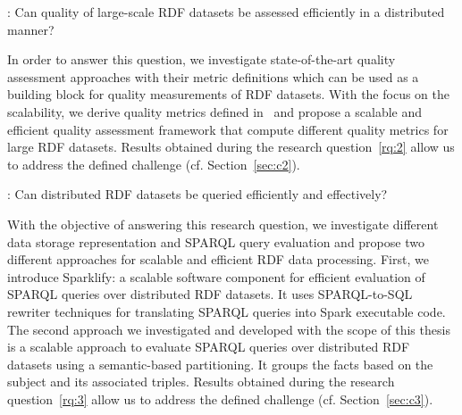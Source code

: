 \begin{tcolorbox}
\textbf{\rqNr[RQ2]\label{rq:2}}: Can quality of large-scale \gls{RDF} datasets be assessed efficiently in a distributed manner?
\end{tcolorbox}

In order to answer this question, we investigate state-of-the-art quality assessment approaches with their metric definitions which can be used as a building block for quality measurements of \gls{RDF} datasets.
With the focus on the scalability, we derive quality metrics defined in~\cite{zaveri2015quality} and propose a scalable and efficient quality assessment framework that compute different quality metrics for large \gls{RDF} datasets.
Results obtained during the research question~\ref{rq:2} allow us to address the defined challenge (cf. Section~\ref{sec:c2}).

\begin{tcolorbox}
\textbf{\rqNr[RQ3]\label{rq:3}}: Can distributed \gls{RDF} datasets be queried efficiently and effectively?
\end{tcolorbox}

With the objective of answering this research question, we investigate different data storage representation and \gls{SPARQL} query evaluation and propose two different approaches for scalable and efficient \gls{RDF} data processing.
First, we introduce Sparklify: a scalable software component for efficient evaluation of \gls{SPARQL} queries over distributed \gls{RDF} datasets.
It uses SPARQL-to-SQL rewriter techniques for translating \gls{SPARQL} queries into Spark executable code.
The second approach we investigated and developed with the scope of this thesis is a scalable approach to evaluate \gls{SPARQL} queries over distributed \gls{RDF} datasets using a semantic-based partitioning.
It groups the facts based on the subject and its associated triples.
Results obtained during the research question~\ref{rq:3} allow us to address the defined challenge (cf. Section~\ref{sec:c3}). 



